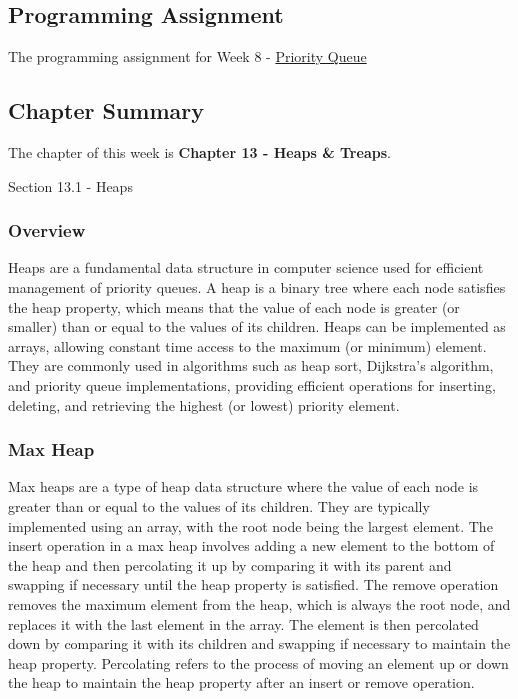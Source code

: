 \subsection{Programming Assignment}

The programming assignment for Week 8 - \href{https://github.com/QuantumCompiler/CU/tree/main/CSPB%202270%20-%20Data%20Structures/CSPB%202270%20-%20Programming%20Assignments/CSPB%202270%20-%20Assignment%206%20-%20Priority%20Queue}{Priority Queue}

\subsection{Chapter Summary}

The chapter of this week is \textbf{Chapter 13 - Heaps \& Treaps}.

\begin{notes}{Section 13.1 - Heaps}
    \subsubsection*{Overview}

    Heaps are a fundamental data structure in computer science used for efficient management of priority queues. A heap is a binary tree where each node satisfies the heap property, which means that the 
    value of each node is greater (or smaller) than or equal to the values of its children. Heaps can be implemented as arrays, allowing constant time access to the maximum (or minimum) element. They are 
    commonly used in algorithms such as heap sort, Dijkstra's algorithm, and priority queue implementations, providing efficient operations for inserting, deleting, and retrieving the highest (or lowest) 
    priority element.
    
    \subsubsection*{Max Heap}
    
    Max heaps are a type of heap data structure where the value of each node is greater than or equal to the values of its children. They are typically implemented using an array, with the root node being 
    the largest element. The insert operation in a max heap involves adding a new element to the bottom of the heap and then percolating it up by comparing it with its parent and swapping if necessary until 
    the heap property is satisfied. The remove operation removes the maximum element from the heap, which is always the root node, and replaces it with the last element in the array. The element is then 
    percolated down by comparing it with its children and swapping if necessary to maintain the heap property. Percolating refers to the process of moving an element up or down the heap to maintain the heap 
    property after an insert or remove operation.
    

\end{notes}
